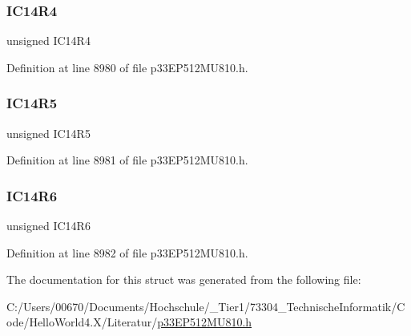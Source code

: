 \subsubsection{\texorpdfstring{I\+C14\+R4}{IC14R4}}
{\footnotesize\ttfamily unsigned I\+C14\+R4}



Definition at line 8980 of file p33\+E\+P512\+M\+U810.\+h.

\mbox{\label{structtag_r_p_i_n_r35_b_i_t_s_a835785cd585afcca698aec77d0b5e58d}} 
\subsubsection{\texorpdfstring{I\+C14\+R5}{IC14R5}}
{\footnotesize\ttfamily unsigned I\+C14\+R5}



Definition at line 8981 of file p33\+E\+P512\+M\+U810.\+h.

\mbox{\label{structtag_r_p_i_n_r35_b_i_t_s_a66d267bd8883ed4e1fdaf3c0f90beda6}} 
\subsubsection{\texorpdfstring{I\+C14\+R6}{IC14R6}}
{\footnotesize\ttfamily unsigned I\+C14\+R6}



Definition at line 8982 of file p33\+E\+P512\+M\+U810.\+h.



The documentation for this struct was generated from the following file\+:\begin{DoxyCompactItemize}
\item 
C\+:/\+Users/00670/\+Documents/\+Hochschule/\+\_\+\+Tier1/73304\+\_\+\+Technische\+Informatik/\+Code/\+Hello\+World4.\+X/\+Literatur/\hyperlink{p33_e_p512_m_u810_8h}{p33\+E\+P512\+M\+U810.\+h}\end{DoxyCompactItemize}
